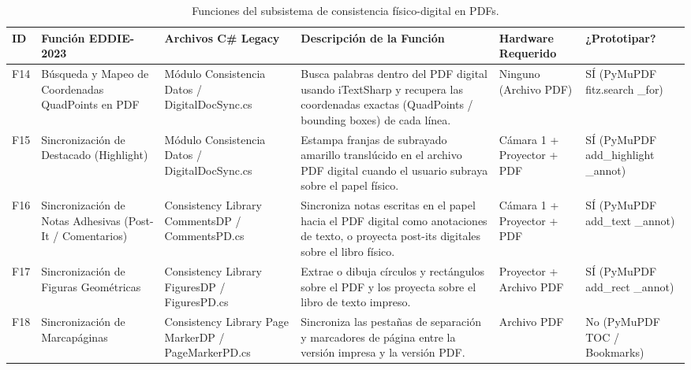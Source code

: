 \begin{table}[H]
    \centering
    \caption{Funciones del subsistema de consistencia físico-digital en PDFs.}
    \label{tab:func_consistencia_pdf}
    \begin{small}
    \begin{tabular}{|L{0.6cm}|L{2.2cm}|L{2.2cm}|L{4.1cm}|L{1.6cm}|L{1.8cm}|}
        \hline
        \textbf{ID} & \textbf{Función EDDIE-2023} & \textbf{Archivos C\# Legacy} & \textbf{Descripción de la Función} & \textbf{Hardware Requerido} & \textbf{¿Prototipar?} \\ \hline
        F14 & Búsqueda y Mapeo de Coordenadas QuadPoints en PDF & Módulo Consistencia Datos / DigitalDocSync.cs & Busca palabras dentro del PDF digital usando iTextSharp y recupera las coordenadas exactas (QuadPoints / bounding boxes) de cada línea. & Ninguno (Archivo PDF) & SÍ (PyMuPDF fitz.search \_for) \\ \hline
        F15 & Sincronización de Destacado (Highlight) & Módulo Consistencia Datos / DigitalDocSync.cs & Estampa franjas de subrayado amarillo translúcido en el archivo PDF digital cuando el usuario subraya sobre el papel físico. & Cámara 1 + Proyector + PDF & SÍ (PyMuPDF add\_highlight \_annot) \\ \hline
        F16 & Sincronización de Notas Adhesivas (Post-It / Comentarios) & Consistency Library CommentsDP / CommentsPD.cs & Sincroniza notas escritas en el papel hacia el PDF digital como anotaciones de texto, o proyecta post-its digitales sobre el libro físico. & Cámara 1 + Proyector + PDF & SÍ (PyMuPDF add\_text \_annot) \\ \hline
        F17 & Sincronización de Figuras Geométricas & Consistency Library FiguresDP / FiguresPD.cs & Extrae o dibuja círculos y rectángulos sobre el PDF y los proyecta sobre el libro de texto impreso. & Proyector + Archivo PDF & SÍ (PyMuPDF add\_rect \_annot) \\ \hline
        F18 & Sincronización de Marcapáginas & Consistency Library Page MarkerDP / PageMarkerPD.cs & Sincroniza las pestañas de separación y marcadores de página entre la versión impresa y la versión PDF. & Archivo PDF & No (PyMuPDF TOC / Bookmarks) \\ \hline
    \end{tabular}
    \end{small}
\end{table}
 
